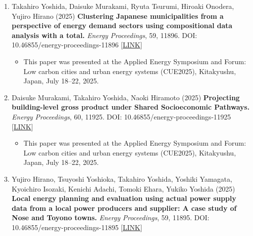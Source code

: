 \documentclass[
]{book}
\providecommand{\tightlist}{%
  \setlength{\itemsep}{0pt}\setlength{\parskip}{0pt}}
\begin{document}
\begin{enumerate}
  \begin{itemize}
  \tightlist
  \item
    This paper was presented at the 20th International 3D GeoInfo Conference 2025 and the 9th International Smart Data and Smart Cities Conference (3DGeoInfo2025 and SDSC2025), Kashiwa, Japan, September 2--5, 2025.
  \end{itemize}
\item
  Takahiro Yoshida, Daisuke Murakami, Ryuta Tsurumi, Hiroaki Onodera, Yujiro Hirano (2025)
  \textbf{Clustering Japanese municipalities from a perspective of energy demand sectors using compositional data analysis with a total.}
  \emph{Energy Proceedings}, 59, 11896.
  DOI: 10.46855/energy-proceedings-11896 {[}\href{https://www.energy-proceedings.org/clustering-japanese-municipalities-from-a-perspective-of-energy-demand-sectors-using-compositional-data-analysis-with-a-total/}{LINK}{]}

  \begin{itemize}
  \tightlist
  \item
    This paper was presented at the Applied Energy Symposium and Forum: Low carbon cities and urban energy systems (CUE2025), Kitakyushu, Japan, July 18--22, 2025.
  \end{itemize}
\item
  Daisuke Murakami, Takahiro Yoshida, Naoki Hiramoto (2025)
  \textbf{Projecting building-level gross product under Shared Socioeconomic Pathways.}
  \emph{Energy Proceedings}, 60, 11925.
  DOI: 10.46855/energy-proceedings-11925 {[}\href{https://www.energy-proceedings.org/projecting-building-level-gross-product-under-shared-socioeconomic-pathways/}{LINK}{]}

  \begin{itemize}
  \tightlist
  \item
    This paper was presented at the Applied Energy Symposium and Forum: Low carbon cities and urban energy systems (CUE2025), Kitakyushu, Japan, July 18--22, 2025.
  \end{itemize}
\item
  Yujiro Hirano, Tsuyoshi Yoshioka, Takahiro Yoshida, Yoshiki Yamagata, Kyoichiro Isozaki, Kenichi Adachi, Tomoki Ehara, Yukiko Yoshida (2025)
  \textbf{Local energy planning and evaluation using actual power supply data from a local power producers and supplier: A case study of Nose and Toyono towns.}
  \emph{Energy Proceedings}, 59, 11895.
  DOI: 10.46855/energy-proceedings-11895 {[}\href{https://www.energy-proceedings.org/local-energy-planning-and-evaluation-using-actual-power-supply-data-from-a-local-power-producer-and-supplier\%3A-a-case-study-of-nose-and-toyono-towns/}{LINK}{]}


\end{enumerate}
\end{document}
